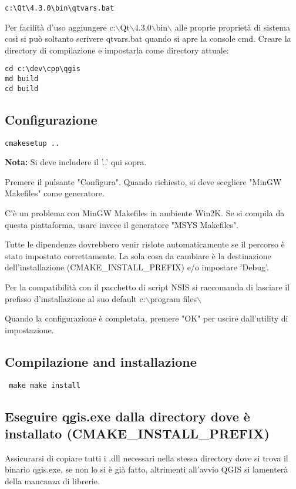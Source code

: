 \begin{verbatim}
c:\Qt\4.3.0\bin\qtvars.bat 
\end{verbatim}

Per facilità d'uso aggiungere c:$\backslash$Qt$\backslash$4.3.0$\backslash$bin$\backslash$ alle proprie proprietà di sistema così si può soltanto scrivere qtvars.bat quando si apre la console cmd.
Creare la directory di compilazione e impostarla come directory attuale:

\begin{verbatim}
cd c:\dev\cpp\qgis 
md build 
cd build 
\end{verbatim}

\subsection{Configurazione}
\begin{verbatim}
cmakesetup ..  
\end{verbatim}

\textbf{Nota:} Si deve includere il '..' qui sopra.

Premere il pulsante "Configura". Quando richiesto, si deve scegliere "MinGW Makefiles" come generatore.

C'è un problema con MinGW Makefiles in ambiente Win2K. Se si compila da questa piattaforma, usare invece il generatore "MSYS Makefiles".

Tutte le dipendenze dovrebbero venir rislote automaticamente se il percorso è stato impostato correttamente. La sola cosa da cambiare è la destinazione dell'installazione (CMAKE\_INSTALL\_PREFIX) e/o impostare 'Debug'.

Per la compatibilità con il pacchetto di script NSIS si raccomanda di lasciare il prefisso d'installazione al suo default c:$\backslash$program files$\backslash$

Quando la configurazione è completata, premere "OK" per uscire dall'utility di impostazione.

\subsection{Compilazione and installazione}
\begin{verbatim}
 make make install 
\end{verbatim}

\subsection{Eseguire qgis.exe dalla directory dove è installato (CMAKE\_INSTALL\_PREFIX)}
Assicurarsi di copiare tutti i .dll necessari nella stessa directory dove si trova il binario qgis.exe, se non lo si è già fatto, altrimenti all'avvio QGIS si lamenterà della mancanza di librerie.

